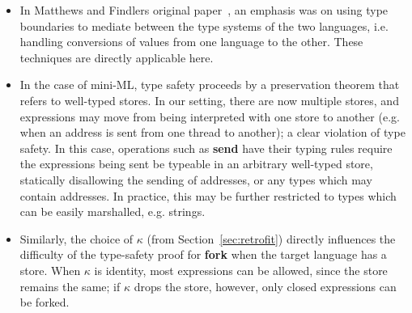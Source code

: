 \begin{itemize}
    \item In Matthews and Findlers original
        paper~\cite{Matthews:2007:OSM:1190216.1190220}, an emphasis was
        on using type boundaries to mediate between the type systems of
        the two languages, i.e. handling conversions of values from
        one language to the other.  These techniques are directly applicable here.

    \item In the case of mini-ML, type safety proceeds by a preservation theorem
        that refers to well-typed stores.  In our setting, there are now multiple
        stores, and expressions may move from being interpreted with one store
        to another (e.g. when an address is sent from one thread to
        another); a clear violation of type safety.  In this case, operations
        such as \textbf{send} have their typing rules require
        the expressions being sent be typeable in an arbitrary well-typed store,
        statically disallowing the sending of addresses, or any types which
        may contain addresses.  In practice, this may be further restricted to
        types which can be easily marshalled, e.g. strings.

    \item Similarly, the choice of $\kappa$ (from Section~\ref{sec:retrofit}) directly
        influences the difficulty of the type-safety proof for
        \textbf{fork} when the target language has a store.  When
        $\kappa$ is identity, most expressions can be allowed, since the store
        remains the same; if $\kappa$ drops the store, however, only closed expressions
        can be forked.
\end{itemize}

